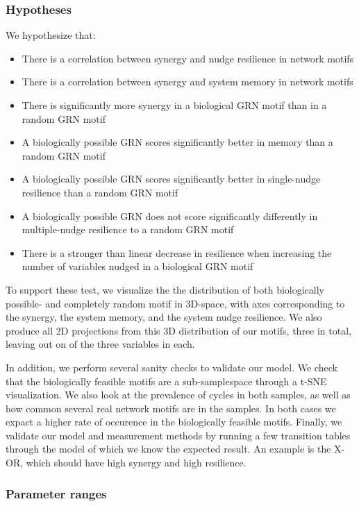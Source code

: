 \documentclass[../main.tex]{subfiles}
\begin{document}
\subsubsection{Hypotheses}

We hypothesize that:

\begin{itemize}
\item There is a correlation between synergy and nudge resilience in network motifs
\item There is a correlation between synergy and system memory in network motifs
\item There is significantly more synergy in a biological GRN motif than in a random GRN motif
\item A biologically possible GRN scores significantly better in memory than a random GRN motif
\item A biologically possible GRN scores significantly better in single-nudge resilience than a random GRN motif
\item A biologically possible GRN does not score significantly differently in multiple-nudge resilience to a random GRN motif
\item There is a stronger than linear decrease in resilience when increasing the number of variables nudged in a biological GRN motif
\end{itemize}

To support these test, we visualize the the distribution of both biologically possible- and completely random motif in 3D-space, with axes corresponding to the synergy, the system memory, and the system nudge resilience.
We also produce all 2D projections from this 3D distribution of our motifs, three in total, leaving out on of the three variables in each.

In addition, we perform several sanity checks to validate our model.
We check that the biologically feasible motifs are a sub-samplespace through a t-SNE visualization.
We also look at the prevalence of cycles in both samples, as well as how common several real network motifs are in the samples.
In both cases we expact a higher rate of occurence in the biologically feasible motifs.
Finally, we validate our model and measurement methods by running a few transition tables through the model of which we know the expected result.
An example is the X-OR, which should have high synergy and high resilience.

\subsubsection{Parameter ranges}
\end{document}
